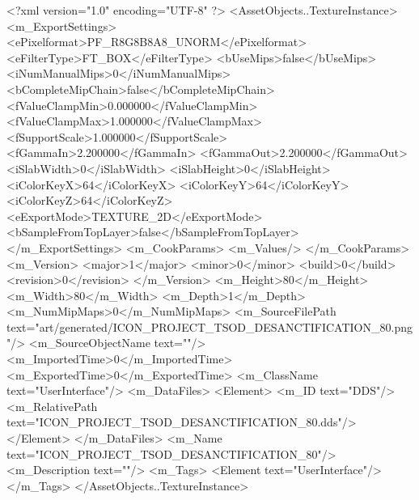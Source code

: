 <?xml version="1.0" encoding="UTF-8" ?>
<AssetObjects..TextureInstance>
	<m_ExportSettings>
		<ePixelformat>PF_R8G8B8A8_UNORM</ePixelformat>
		<eFilterType>FT_BOX</eFilterType>
		<bUseMips>false</bUseMips>
		<iNumManualMips>0</iNumManualMips>
		<bCompleteMipChain>false</bCompleteMipChain>
		<fValueClampMin>0.000000</fValueClampMin>
		<fValueClampMax>1.000000</fValueClampMax>
		<fSupportScale>1.000000</fSupportScale>
		<fGammaIn>2.200000</fGammaIn>
		<fGammaOut>2.200000</fGammaOut>
		<iSlabWidth>0</iSlabWidth>
		<iSlabHeight>0</iSlabHeight>
		<iColorKeyX>64</iColorKeyX>
		<iColorKeyY>64</iColorKeyY>
		<iColorKeyZ>64</iColorKeyZ>
		<eExportMode>TEXTURE_2D</eExportMode>
		<bSampleFromTopLayer>false</bSampleFromTopLayer>
	</m_ExportSettings>
	<m_CookParams>
		<m_Values/>
	</m_CookParams>
	<m_Version>
		<major>1</major>
		<minor>0</minor>
		<build>0</build>
		<revision>0</revision>
	</m_Version>
	<m_Height>80</m_Height>
	<m_Width>80</m_Width>
	<m_Depth>1</m_Depth>
	<m_NumMipMaps>0</m_NumMipMaps>
	<m_SourceFilePath text="art/generated/ICON_PROJECT_TSOD_DESANCTIFICATION_80.png"/>
	<m_SourceObjectName text=""/>
	<m_ImportedTime>0</m_ImportedTime>
	<m_ExportedTime>0</m_ExportedTime>
	<m_ClassName text="UserInterface"/>
	<m_DataFiles>
		<Element>
			<m_ID text="DDS"/>
			<m_RelativePath text="ICON_PROJECT_TSOD_DESANCTIFICATION_80.dds"/>
		</Element>
	</m_DataFiles>
	<m_Name text="ICON_PROJECT_TSOD_DESANCTIFICATION_80"/>
	<m_Description text=""/>
	<m_Tags>
		<Element text="UserInterface"/>
	</m_Tags>
</AssetObjects..TextureInstance>
